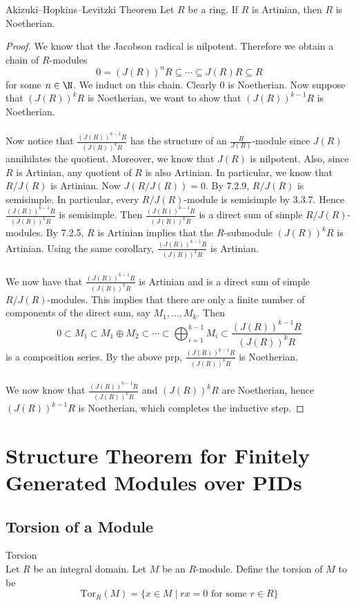 \documentclass[a4paper]{article}
\begin{document}
\begin{thm}{Akizuki–Hopkins–Levitzki Theorem}{} Let $R$ be a ring. If $R$ is Artinian, then $R$ is Noetherian. 
\begin{proof}
We know that the Jacobson radical is nilpotent. Therefore we obtain a chain of $R$-modules $$0=(J(R))^nR\subseteq\cdots\subseteq J(R)R\subseteq R$$ for some $n\in\N$. We induct on this chain. Clearly $0$ is Noetherian. Now suppose that $(J(R))^kR$ is Noetherian, we want to show that $(J(R))^{k-1}R$ is Noetherian. \\~\\

Now notice that $\frac{(J(R))^{k-1}R}{(J(R))^kR}$ has the structure of an $\frac{R}{J(R)}$-module since $J(R)$ annihilates the quotient. Moreover, we know that $J(R)$ is nilpotent. Also, since $R$ is Artinian, any quotient of $R$ is also Artinian. In particular, we know that $R/J(R)$ is Artinian. Now $J(R/J(R))=0$. By 7.2.9, $R/J(R)$ is semisimple. In particular, every $R/J(R)$-module is semisimple by 3.3.7. Hence $\frac{(J(R))^{k-1}R}{(J(R))^kR}$ is semisimple. Then $\frac{(J(R))^{k-1}R}{(J(R))^kR}$ is a direct sum of simple $R/J(R)$-modules. By 7.2.5, $R$ is Artinian implies that the $R$-submodule $(J(R))^kR$ is Artinian. Using the same corollary, $\frac{(J(R))^{k-1}R}{(J(R))^kR}$ is Artinian. \\~\\

We now have that $\frac{(J(R))^{k-1}R}{(J(R))^kR}$ is Artinian and is a direct sum of simple $R/J(R)$-modules. This implies that there are only a finite number of components of the direct sum, say $M_1,\dots,M_k$. Then $$0\subset M_1\subset M_1\oplus M_2\subset\cdots\subset\bigoplus_{i=1}^{k-1}M_i\subset\frac{(J(R))^{k-1}R}{(J(R))^kR}$$ is a composition series. By the above prp, $\frac{(J(R))^{k-1}R}{(J(R))^kR}$ is Noetherian. \\~\\

We now know that $\frac{(J(R))^{k-1}R}{(J(R))^kR}$ and $(J(R))^kR$ are Noetherian, hence $(J(R))^{k-1}R$ is Noetherian, which completes the inductive step. 
\end{proof}
\end{thm}

\pagebreak
\section{Structure Theorem for Finitely Generated Modules over PIDs}
\subsection{Torsion of a Module}
\begin{defn}{Torsion}{}\\
Let $R$ be an integral domain. Let $M$ be an $R$-module. Define the torsion of $M$ to be $$\text{Tor}_R(M)=\{x\in M\;|\;rx=0\text{ for some }r\in R\}$$
\end{defn}
\end{document}
